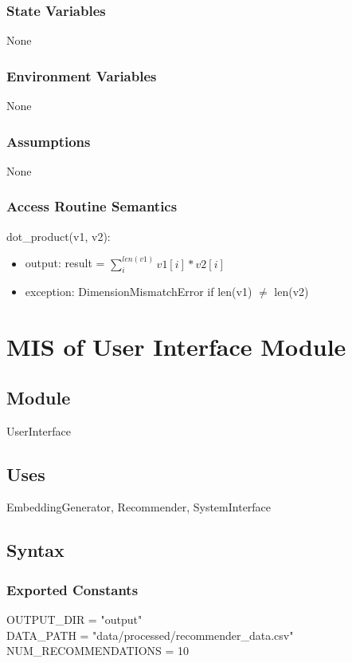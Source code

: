 \documentclass[12pt, titlepage]{article}
\begin{document}
\subsubsection{State Variables}
None

\subsubsection{Environment Variables}

None

\subsubsection{Assumptions}

None

\subsubsection{Access Routine Semantics}

\noindent dot\_product(v1, v2):
\begin{itemize}
\item output: result = $\sum_i^{len(v1)} v1[i] * v2[i]$
\item exception: DimensionMismatchError if len(v1) $\neq$ len(v2)
\end{itemize}


\section{MIS of User Interface Module} \label{ModuleUI}

\subsection{Module}

UserInterface

\subsection{Uses}
EmbeddingGenerator, Recommender, SystemInterface

\subsection{Syntax}

\subsubsection{Exported Constants}
OUTPUT\_DIR = "output"\\
DATA\_PATH = "data/processed/recommender\_data.csv"\\
NUM\_RECOMMENDATIONS = 10
\end{document}
